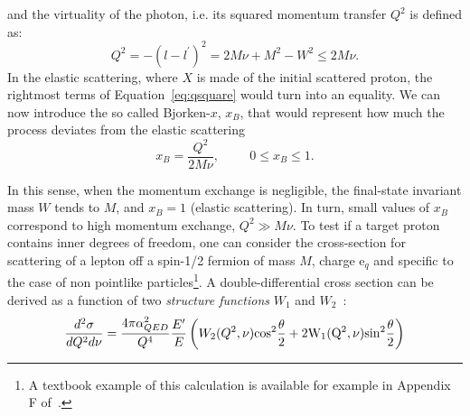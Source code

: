 and the virtuality of the photon, i.e. its squared momentum transfer
$Q^{2}$ is defined as:
\begin{equation}
Q^{2} = -(l - l^{'})^{2} = 2M\nu + M^{2} - W^{2} \leq
2M\nu .
\label{eq:qsquare}
\end{equation}
In the elastic scattering, where $X$ is made of the initial scattered proton, the rightmost terms of Equation~\ref{eq:qsquare} would turn into an equality.
We can now introduce the so called Bjorken-$x$, $x_{B}$, that would represent how much the
process deviates from the elastic scattering
\begin{equation}
x_{B} = \frac{Q^{2}}{2M\nu}, \hspace{1cm} 0 \leq x_{B} \leq 1.
\end{equation}

 In this sense, when the momentum exchange is negligible, the
final-state invariant mass $W$ tends to $M$, and $x_{B} = 1$
(elastic scattering). In turn, small values of $x_{B}$ correspond to
high momentum exchange, $Q^{2} \gg M \nu$. To test if a target proton contains inner degrees of
freedom, one can consider the cross-section for scattering of a lepton
off a spin-1/2 fermion of mass $M$, charge e$_q$ and specific to
the case of non pointlike particles\footnote{A textbook example of
  this calculation is available for example in Appendix F of~\cite{qcd_book}.}. A double-differential cross
section can be derived as a function of two \emph{structure functions} $W_1$ and $W_2$~\cite{qcd_book}:
\begin{equation}
\frac{d^{2}\sigma}{dQ^{2}d\nu} = \frac{4\pi\alpha^{2}_{QED}}{Q^{4}}\frac{E'}{E}\left( W_2(Q^{2},\nu)\rm{cos}^2\frac{\theta}{2} +
    2W_1(Q^{2},\nu)\rm{sin}^2\frac{\theta}{2} \right)
\label{eq:QED_DIScrosssection}
\end{equation}


